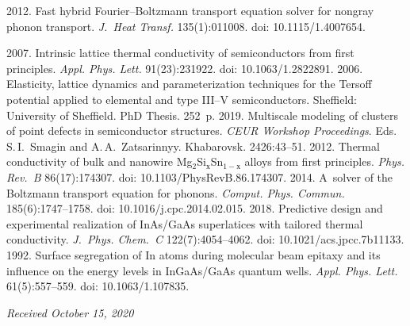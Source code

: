 \begin{multicols}{2}
{{\begin{thebibliography}{99}
   2012. Fast hybrid Fourier--Boltzmann transport 
equation solver for nongray phonon transport. \textit{J.~Heat Transf.} 135(1):011008. doi: 
10.1115/1.4007654.

   2007. Intrinsic lattice 
thermal conductivity of semiconductors from first principles. \textit{Appl. Phys. Lett.} 91(23):231922. doi: 
10.1063/1.2822891. 
   2006. Elasticity, lattice dynamics and parameterization techniques for the Tersoff potential 
applied to elemental and type III--V semiconductors. Sheffield: University of Sheffield. PhD Thesis. 252~p.
 2019. Multiscale modeling of 
clusters of point defects in semiconductor structures. \textit{CEUR Workshop Proceedings}.  
Eds. S.\,I.~Smagin and A.\,A.~Zatsarinnyy. Khabarovsk. 2426:43--51.
   2012. Thermal conductivity of 
bulk and nanowire Mg$_2$Si$_х$Sn$_{1-х}$ alloys from first principles. \textit{Phys. Rev.~B} 
86(17):174307. doi: 10.1103/PhysRevB.86.174307.
   2014. A~solver of the Boltzmann transport 
equation for phonons. \textit{Comput. Phys. Commun.} 185(6):1747--1758. doi: 
10.1016/j.cpc.2014.02.015.
   2018. Predictive design and experimental realization of InAs/GaAs 
superlatices with tailored thermal conductivity. \textit{J.~Phys. Chem.~C} 
122(7):4054--4062. doi: 10.1021/acs.jpcc.7b11133.
   1992. Surface segregation of In atoms during 
molecular beam epitaxy and its influence on the energy levels in \mbox{InGaAs}/\mbox{GaAs} quantum wells. \textit{Appl. Phys. 
Lett.} 61(5):557--559. doi: 10.1063/1.107835.
\end{thebibliography}

 }
 }

\end{multicols}

\vspace*{-3pt}

\hfill{\small\textit{Received October 15, 2020}}

